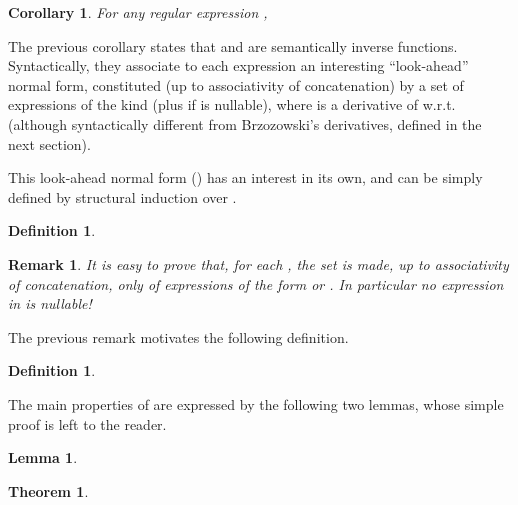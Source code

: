 \documentclass[preprint]{sigplanconf}
\newcounter{item}
\newtheorem{theorem}[item]{Theorem}
\newtheorem{lemma}[item]{Lemma}
\newtheorem{definition}[item]{Definition}
\newtheorem{remark}[item]{Remark}
\newtheorem{corollary}[item]{Corollary}
\begin{document}
\begin{corollary}
For any regular expression ,

\end{corollary}

The previous corollary states that  and  are semantically
inverse functions. Syntactically, they associate to each expression 
an interesting ``look-ahead'' normal form, constituted (up to associativity
of concatenation) by a set of expressions of the kind  
(plus  if  is nullable), where
 is a derivative of  w.r.t.  (although syntactically different
from Brzozowski's derivatives, defined in the next section).
 
This look-ahead normal form () has an interest in its own, and can be 
simply defined by structural induction over .

\begin{definition}

\end{definition}

\begin{remark}\label{not_nullable}
It is easy to prove that, for each , 
the set  is made, up to associativity of concatenation,
only of expressions of the form  or . In particular
no expression in  is nullable!
\end{remark}

\noindent
The previous remark motivates the following definition.

\begin{definition}

\end{definition}
The main properties of  are expressed by the following
two lemmas, whose simple proof is left to the reader.
\begin{lemma}\label{lemma:nf}

\end{lemma}


\begin{theorem}\label{techz}
 
\end{theorem}
\end{document}
